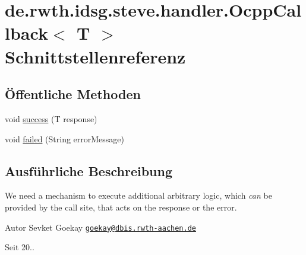 \hypertarget{interfacede_1_1rwth_1_1idsg_1_1steve_1_1handler_1_1_ocpp_callback_3_01_t_01_4}{\section{de.\+rwth.\+idsg.\+steve.\+handler.\+Ocpp\+Callback$<$ T $>$ Schnittstellenreferenz}
\label{interfacede_1_1rwth_1_1idsg_1_1steve_1_1handler_1_1_ocpp_callback_3_01_t_01_4}
}
\subsection*{Öffentliche Methoden}
\begin{DoxyCompactItemize}
\item 
void \hyperlink{interfacede_1_1rwth_1_1idsg_1_1steve_1_1handler_1_1_ocpp_callback_3_01_t_01_4_a155f022605b4edc7f4b019e08c5bfc2f}{success} (T response)
\item 
void \hyperlink{interfacede_1_1rwth_1_1idsg_1_1steve_1_1handler_1_1_ocpp_callback_3_01_t_01_4_a554723ff83899c716d9b3a3d2fd76c46}{failed} (String error\+Message)
\end{DoxyCompactItemize}


\subsection{Ausführliche Beschreibung}
We need a mechanism to execute additional arbitrary logic, which {\itshape can} be provided by the call site, that acts on the response or the error.

\begin{DoxyAuthor}{Autor}
Sevket Goekay \href{mailto:goekay@dbis.rwth-aachen.de}{\tt goekay@dbis.\+rwth-\/aachen.\+de} 
\end{DoxyAuthor}
\begin{DoxySince}{Seit}
20.. 
\end{DoxySince}



